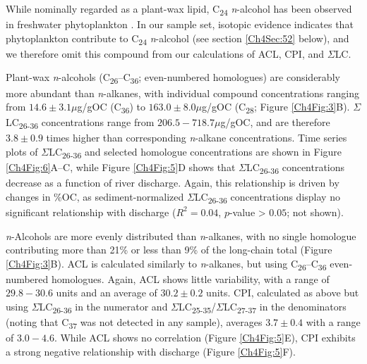 While nominally regarded as a plant-wax lipid, C\textsubscript{24} \textit{n}-alcohol has been observed in freshwater phytoplankton \citep{Volkman:1998tk,Volkman:1999tq,Xu:2007jk}. In our sample set, isotopic evidence indicates that phytoplankton contribute to C\textsubscript{24} \textit{n}-alcohol (see section \ref{Ch4Sec:52} below), and we therefore omit this compound from our calculations of ACL, CPI, and $\Sigma$LC. 

Plant-wax \textit{n}-alcohols (C\textsubscript{26}--C\textsubscript{36}; even-numbered homologues) are considerably more abundant than \textit{n}-alkanes, with individual compound concentrations ranging from $14.6 \pm 3.1 \mu$g/gOC (C\textsubscript{36}) to $163.0 \pm 8.0 \mu$g/gOC (C\textsubscript{28}; Figure \ref{Ch4Fig:3}B). $\Sigma$LC\textsubscript{26-36} concentrations range from $206.5 - 718.7 \mu$g/gOC, and are therefore $3.8 \pm 0.9$ times higher than corresponding \textit{n}-alkane concentrations. Time series plots of $\Sigma$LC\textsubscript{26-36} and selected homologue concentrations are shown in Figure \ref{Ch4Fig:6}A--C, while Figure \ref{Ch4Fig:5}D shows that $\Sigma$LC\textsubscript{26-36} concentrations decrease as a function of river discharge. Again, this relationship is driven by changes in \%OC, as sediment-normalized $\Sigma$LC\textsubscript{26-36} concentrations display no significant relationship with discharge ($R^2 = 0.04$, $p$-value > $0.05$; not shown).

\textit{n}-Alcohols are more evenly distributed than \textit{n}-alkanes, with no single homologue contributing more than 21\% or less than 9\% of the long-chain total (Figure \ref{Ch4Fig:3}B). ACL is calculated similarly to \textit{n}-alkanes, but using C\textsubscript{26}--C\textsubscript{36} even-numbered homologues. Again, ACL shows little variability, with a range of $29.8 - 30.6$ units and an average of $30.2 \pm 0.2$ units. CPI, calculated as above but using $\Sigma$LC\textsubscript{26-36} in the numerator and $\Sigma$LC\textsubscript{25-35}/$\Sigma$LC\textsubscript{27-37} in the denominators (noting that C\textsubscript{37} was not detected in any sample), averages $3.7 \pm 0.4$ with a range of $3.0 - 4.6$. While ACL shows no correlation (Figure \ref{Ch4Fig:5}E), CPI exhibits a strong negative relationship with discharge (Figure \ref{Ch4Fig:5}F).

